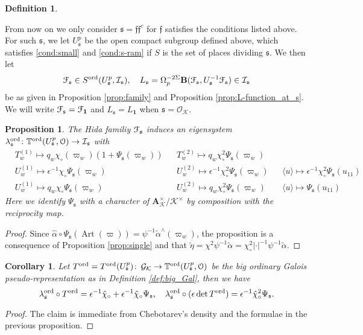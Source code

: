 \documentclass[leqno]{amsart}
\newtheorem{prop}[thm]{Proposition}
\newtheorem{cor}[thm]{Corollary}
\theoremstyle{definition}
\newtheorem{defn}[thm]{Definition}
\theoremstyle{remark}
\newcommand{\id}{\mathbf{1}}
\newcommand{\oo}{\mathcal{O}}
\newcommand{\eo}{\EuScript{O}}
\newcommand{\A}{\mathbf A}
\DeclareMathOperator{\Gal}{\mathcal{G}}
\DeclareMathOperator{\Art}{Art}
\newcommand{\ff}{\mathfrak{f}}
\newcommand{\fs}{\mathfrak{s}}
\newcommand{\K}{{\mathcal{K}}} %
\newcommand{\TT}{\mathbb{T}} %
\newcommand{\euF}{\EuScript{F}} %
\newcommand{\I}{\mathcal{I}} %
\newcommand{\ord}{\textnormal{ord}} %
\begin{document}
\begin{defn}\label{def:family_at_s}

From now on we only consider $\fs=\ff\ff^c$ for 
$\ff$ satisfies the conditions listed above.
For such $\fs$, we let $U_\fs^p$
be the open compact subgroup defined above, which satisfies
\eqref{cond:small} and \eqref{cond:s-ram}
if $S$ is the set of places dividing $\fs$.
We then let
\[
    \euF_{\fs}\in 
    S^{\ord}(U^p_{\fs},\I_\fs),\quad
    L_\fs=\Omega_p^{-2\Sigma}
    \mathbf{B}(\euF_{\fs}, U_\fs^{-1}\euF_{\fs})
    \in \I_\fs
\]
be as given in Proposition \ref{prop:family} and
Proposition \ref{prop:L-function_at_s}.
We will write $\euF_\fs=\euF_\id$ and $L_\fs=L_\id$
when $\fs=\oo_\K$.
\end{defn}


\begin{prop}\label{prop:eigensystem}
The Hida familiy $\euF_\fs$ induces an eigensystem
$\lambda_{\fs}^{\ord}\colon \TT^{\ord}(U^p_\fs,\eo)\to\I_\fs$ with
\begin{align*}
&T_w^{(1)}\mapsto
q_w\chi_\circ(\varpi_w)(1+\Psi_\fs(\varpi_w))&
&T_w^{(2)}\mapsto q_w\chi_\circ^2\Psi_\fs(\varpi_w)\\
&U_{w}^{(1)}\mapsto
\epsilon^{-1}\chi_\circ\Psi_\fs(\varpi_w)&
&U_{w}^{(2)}\mapsto
\epsilon^{-1}\chi_\circ^2\Psi_\fs(\varpi_w)&
&\langle u\rangle\mapsto
\epsilon^{-1}\chi_\circ^2\Psi_\fs(u_{11})\\
&U_{w}^{(1)}\mapsto q_w\chi_\circ\Psi_\fs(\varpi_w)&
&U_{w}^{(2)}\mapsto q_w\chi_\circ^2\Psi_\fs(\varpi_w)&
&\langle u\rangle\mapsto \Psi_\fs(u_{11})
\end{align*}
Here we identify $\Psi_\fs$ with a character of 
$\A_{\K}^\times/\K^\times$ by composition with the 
reciprocity map.
\end{prop}
\begin{proof}
Since $\widehat{\alpha}\circ\Psi_\fs(\Art(\varpi))=
\psi^{-1}\tilde{\alpha}^\wedge(\varpi_w)$,
the proposition is a consequence of Proposition \ref{prop:single}
and that 
$\tilde{\eta}=\chi^2\psi^{-1}\tilde{\alpha}
=\chi_\circ^2|\cdot|^{-1}\psi^{-1}\tilde{\alpha}$.
\end{proof}

\begin{cor}\label{cor:reducible}
Let $T^{\ord}=T^{\ord}(U^p_\fs)
\colon\Gal_\K\to \TT^{\ord}(U^p_\fs,\eo)$
be the big ordinary Galois pseudo-representation
as in Definition \ref{def:big_Gal}, then we have
\begin{equation*}
    \lambda_{\fs}^{\ord}\circ T^{\ord}=
    \epsilon^{-1}\hat{\chi}_\circ+
    \epsilon^{-1}\hat{\chi}_\circ\Psi_\fs,\quad
    \lambda_{\fs}^{\ord}\circ (\epsilon \det T^{\ord})=
    \epsilon^{-1}\hat{\chi}^2_\circ\Psi_\fs.
\end{equation*}
\end{cor}
\begin{proof}
The claim is immediate from Chebotarev's density
and the formulae in the previous proposition.
\end{proof}
\end{document}
